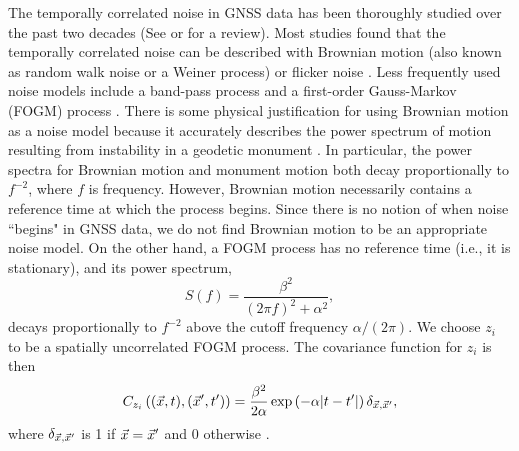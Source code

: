 \documentclass[extra,mreferee]{gji}
\begin{document}

The temporally correlated noise in GNSS data has been thoroughly
studied over the past two decades (See \citet{Bock2016} or
\citet{He2017} for a review). Most studies found that the temporally
correlated noise can be described with Brownian motion (also known as
random walk noise or a Weiner process) or flicker noise
\citep[e.g.,][]{Zhang1997, Mao1999, Williams2004, Langbein2008,
Murray2017}. Less frequently used noise models include a band-pass
process \citep[e.g.,][]{Langbein2004} and a first-order Gauss-Markov
(FOGM) process \citep[e.g.,][]{Langbein2004,Dmitrieva2015}. There is
some physical justification for using Brownian motion as a noise model
because it accurately describes the power spectrum of motion resulting
from instability in a geodetic monument \citep[e.g.,][]{Wyatt1982,
Wyatt1989}. In particular, the power spectra for Brownian motion and
monument motion both decay proportionally to $f^{-2}$, where $f$ is
frequency. However, Brownian motion necessarily contains a reference
time at which the process begins. Since there is no notion of when
noise ``begins" in GNSS data, we do not find Brownian motion to be an
appropriate noise model. On the other hand, a FOGM process has no
reference time (i.e., it is stationary), and its power spectrum,
\begin{equation}\label{eq:FOGMPS} 
S(f) = \frac{\beta^2}{(2 \pi f)^2 + \alpha^2}, 
\end{equation} 
decays proportionally to $f^{-2}$ above the cutoff frequency $\alpha /
(2 \pi)$. We choose $z_i$ to be a spatially uncorrelated FOGM process.
The covariance function for $z_i$ is then
\begin{equation}\label{eq:FOGM}
C_{z_i}\left((\vec{x},t),(\vec{x}',t')\right) = \frac{\beta^2}{2\alpha} 
                                          \exp\left(-\alpha|t - t'|\right)\delta_{\vec{x},\vec{x}'}, 
\end{equation}
where $\delta_{\vec{x},\vec{x}'}$ is 1 if $\vec{x} = \vec{x}'$ and 0 otherwise
\citep[sec. B2]{Rasmussen2006}.


\end{document}
